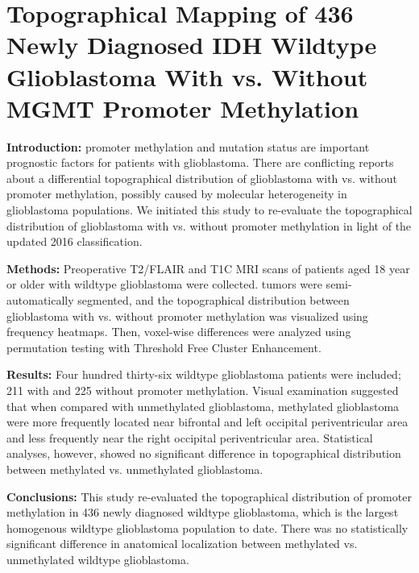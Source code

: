 \chapter[Topographical Mapping of 436 Newly Diagnosed IDH Wildtype Glioblastoma With vs. Without MGMT Promoter Methylation][HGG MGMT topographical mapping]{Topographical Mapping of 436 Newly Diagnosed IDH Wildtype Glioblastoma With vs. Without MGMT Promoter Methylation}\label{chap:HGGLocation}


\begin{ChapterAbstract}
    \textbf{Introduction:}  promoter methylation and  mutation status are important prognostic factors for patients with glioblastoma.
    There are conflicting reports about a differential topographical distribution of glioblastoma with vs. without  promoter methylation, possibly caused by molecular heterogeneity in glioblastoma populations.
    We initiated this study to re-evaluate the topographical distribution of glioblastoma with vs. without  promoter methylation in light of the updated  2016 classification.

    \textbf{Methods:} Preoperative \acrlong{T2}/\acrlong{FLAIR} and \acrlong{T1C} \acrlong{MRI} scans of patients aged 18 year or older with  wildtype glioblastoma were collected.
    \Glspl{tumor} were semi-automatically segmented, and the topographical distribution between glioblastoma with vs. without  promoter methylation was visualized using frequency heatmaps.
    Then, voxel-wise differences were analyzed using permutation testing with Threshold Free Cluster Enhancement.

    \textbf{Results:} Four hundred thirty-six  wildtype glioblastoma patients were included; 211 with and 225 without  promoter methylation.
    Visual examination suggested that when compared with  unmethylated glioblastoma,  methylated glioblastoma were more frequently located near bifrontal and left occipital periventricular area and less frequently near the right occipital periventricular area.
    Statistical analyses, however, showed no significant difference in topographical distribution between  methylated vs.  unmethylated glioblastoma.

    \textbf{Conclusions:} This study re-evaluated the topographical distribution of  promoter methylation in 436 newly diagnosed  wildtype glioblastoma, which is the largest homogenous  wildtype glioblastoma population to date.
    There was no statistically significant difference in anatomical localization between  methylated vs. unmethylated  wildtype glioblastoma.
\end{ChapterAbstract}

